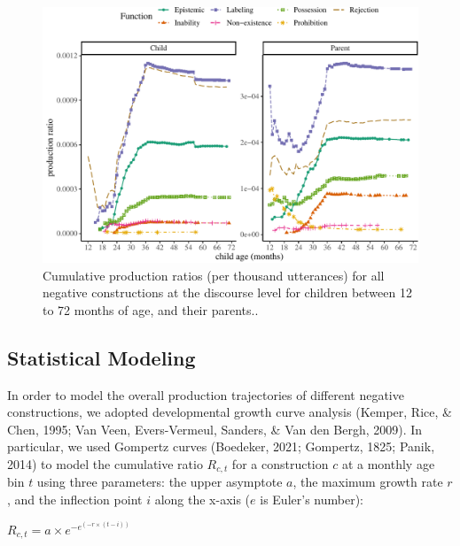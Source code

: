 \documentclass[
  man,floatsintext]{apa6}
\begin{document}
\begin{figure}[H]

{\centering \includegraphics{neg_construction_article_files/figure-latex/alldiscourse-1} 

}

\caption{Cumulative production ratios (per thousand utterances) for all negative constructions at the discourse level for children between 12 to 72 months of age, and their parents..}\label{fig:alldiscourse}
\end{figure}

\hypertarget{statistical-modeling}{%
\subsection{Statistical Modeling}\label{statistical-modeling}}

In order to model the overall production trajectories of different negative constructions, we adopted developmental growth curve analysis (Kemper, Rice, \& Chen, 1995; Van Veen, Evers-Vermeul, Sanders, \& Van den Bergh, 2009). In particular, we used Gompertz curves (Boedeker, 2021; Gompertz, 1825; Panik, 2014) to model the cumulative ratio \(R_{c,t}\) for a construction \(c\) at a monthly age bin \(t\) using three parameters: the upper asymptote \(a\), the maximum growth rate \(r\), and the inflection point \(i\) along the x-axis (\(e\) is Euler's number):

\(R_{c, t} = a \times e^{-e^{(-r \times (t - i))}}\)
\end{document}
